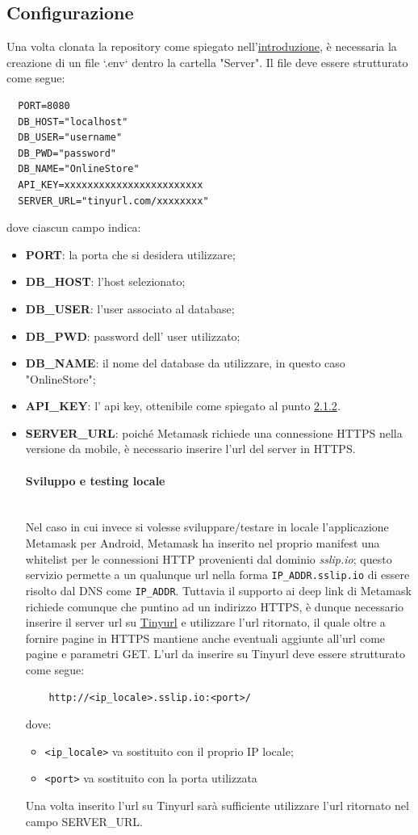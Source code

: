 \documentclass[a4paper, 12pt]{article}
\begin{document}
\subsection{Configurazione}
\label{sec:config_server}
Una volta clonata la repository come spiegato nell'\hyperref[sec:intro]{introduzione}, è necessaria la creazione di un file `.env` dentro la cartella "Server". Il file deve essere strutturato come segue:
\begin{verbatim}
  PORT=8080
  DB_HOST="localhost"
  DB_USER="username"
  DB_PWD="password"
  DB_NAME="OnlineStore"
  API_KEY=xxxxxxxxxxxxxxxxxxxxxxxx
  SERVER_URL="tinyurl.com/xxxxxxxx"
\end{verbatim}
dove ciascun campo indica:
\begin{itemize}
  \item \textbf{PORT}: la porta che si desidera utilizzare;
  \item \textbf{DB\_HOST}: l'host selezionato;
  \item \textbf{DB\_USER}: l'user associato al database;
  \item \textbf{DB\_PWD}: password dell' user utilizzato;
  \item \textbf{DB\_NAME}: il nome del database da utilizzare, in questo caso "OnlineStore";
  \item \textbf{API\_KEY}: l' api key, ottenibile come spiegato al punto \hyperref[sec:provider]{2.1.2}.
  \mbox{}
  \item \textbf{SERVER\_URL}: poiché Metamask richiede una connessione HTTPS nella versione da mobile, è necessario inserire l'url del server in HTTPS.\\
  \paragraph{Sviluppo e testing locale}\\
  Nel caso in cui invece si volesse sviluppare/testare in locale l'applicazione Metamask per Android, Metamask ha inserito nel proprio manifest una whitelist per le connessioni HTTP provenienti dal dominio \textit{sslip.io}; questo servizio permette a un qualunque url nella forma \verb|IP_ADDR.sslip.io| di essere risolto dal DNS come \verb|IP_ADDR|. Tuttavia il supporto ai deep link di Metamask richiede comunque che puntino ad un indirizzo HTTPS, è dunque necessario inserire il server url su \href{https://tinyurl.com/app}{Tinyurl} e utilizzare l'url ritornato, il quale oltre a fornire pagine in HTTPS mantiene anche eventuali aggiunte all'url come pagine e parametri GET. L'url da inserire su Tinyurl deve essere strutturato come segue:
  \begin{verbatim}
    http://<ip_locale>.sslip.io:<port>/
  \end{verbatim}
  dove:
  \begin{itemize}
    \item \verb|<ip_locale>| va sostituito con il proprio IP locale;
    \item \verb|<port>| va sostituito con la porta utilizzata
  \end{itemize}
  Una volta inserito l'url su Tinyurl sarà sufficiente utilizzare l'url ritornato nel campo SERVER\_URL.
\end{itemize}
\end{document}
